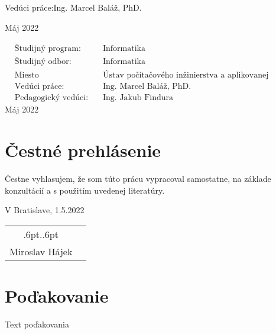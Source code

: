 \documentclass[12pt, a4paper, twoside, openright, slovak]{book}
\newcommand{\emptypage}{\newpage\thispagestyle{empty}\mbox{}\newpage}
\newcommand{\signaturespace}[2]{
  \begingroup
  \renewcommand{\arraystretch}{0}
  \begin{tabular}[t]{cc}
  \hspace*{0pt}
  \cleaders\hbox{\kern.6pt.\kern.6pt}\hskip#1\relax
  \hspace*{0pt}
  \\[0.5cm]
  #2
  \end{tabular}
  \endgroup
}
\newcommand{\Author}[0] {Miroslav Hájek}
\newcommand{\Supervisor}[0] {Ing. Marcel Baláž, PhD.}
\newcommand{\PedagogicalSupervisor}[0] {Ing. Jakub Findura}
\newcommand{\Date}[0] {Máj 2022}
\newcommand{\StudyProgramme}[0] {Informatika}
\newcommand{\StudyField}[0] {Informatika}
\newcommand{\Institute}[0] {Ústav počítačového inžinierstva a aplikovanej informatiky}
\newcommand{\SignPlace}[0] {V Bratislave, }
\newcommand{\SignDate}[0] {1.5.2022}
\begin{document}

\begin{flushleft}
Vedúci práce:\quad \Supervisor{\Large \par}
\vspace{\medskipamount}
\Date
\end{flushleft}

\emptypage


\begin{flushleft}
\begin{align*}
& \text{Študijný program:} && \text{\StudyProgramme} \\
& \text{Študijný odbor:} && \text{\StudyField} \\
& \text{Miesto vypracovania:} && \text{\Institute} \\
& \text{Vedúci práce:} && \text{\Supervisor} \\
& \text{Pedagogický vedúci:} && \text{\PedagogicalSupervisor}
\end{align*}
\vspace{2\bigskipamount}
\Date
\end{flushleft}

\emptypage

\newpage
\thispagestyle{empty}

\newpage

\emptypage
{}

\thispagestyle{empty}
\vspace*{\fill}
\section*{Čestné prehlásenie}
Čestne vyhlasujem, že som túto prácu vypracoval samostatne, na základe konzultácií
a s použitím uvedenej literatúry.

\vspace{3\medskipamount}\noindent
\SignPlace \SignDate \hspace*{\fill} \signaturespace{5cm}{\Author}
\emptypage

\thispagestyle{empty}
\vspace*{\fill}
\section*{Poďakovanie}
Text poďakovania
\emptypage

\thispagestyle{empty}
\end{document}
